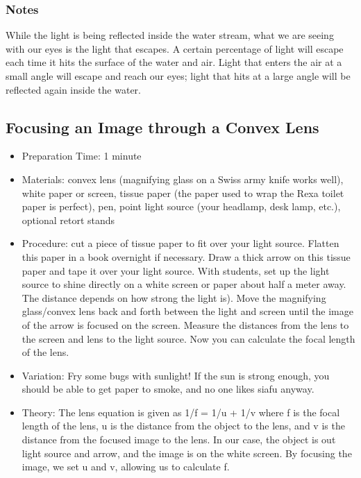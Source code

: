 \subsubsection*{Notes}
While the light is being reflected inside the water stream, what we are seeing with our eyes is the light that escapes.  A certain percentage of light will escape each time it hits the surface of the water and air.  Light that enters the air at a small angle will escape and reach our eyes; light that hits at a large angle will be reflected again inside the water.


		
		

\subsection{Focusing an Image through a Convex Lens}
\begin{itemize}
\item{Preparation Time: 1 minute}
\item{Materials: convex lens (magnifying glass on a Swiss army knife works well), white paper or screen, tissue paper (the paper used to wrap the Rexa toilet paper is perfect), pen, point light source (your headlamp, desk lamp, etc.), optional retort stands}
\item{Procedure: cut a piece of tissue paper to fit over your light source. Flatten this paper in a book overnight if necessary. Draw a thick arrow on this tissue paper and tape it over your light source. With students, set up the light source to shine directly on a white screen or paper about half a meter away. The distance depends on how strong the light is). Move the magnifying glass/convex lens back and forth between the light and screen until the image of the arrow is focused on the screen. Measure the distances from the lens to the screen and lens to the light source. Now you can calculate the focal length of the lens.}
\item{Variation: Fry some bugs with sunlight! If the sun is strong enough, you should be able to get paper to smoke, and no one likes siafu anyway.}
\item{Theory: The lens equation is given as 1/f = 1/u + 1/v where f is the focal length of the lens, u is the distance from the object to the lens, and v is the distance from the focused image to the lens. In our case, the object is out light source and arrow, and the image is on the white screen. By focusing the image, we set u and v, allowing us to calculate f.}
\end{itemize}


